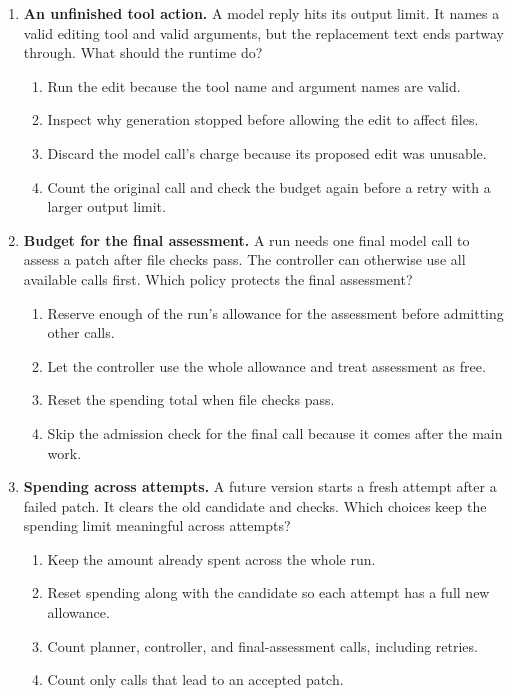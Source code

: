 \begin{enumerate}[start=51,itemsep=0.7\baselineskip]
\item\label{exercise:57} \begin{minipage}[t]{\linewidth}
\textbf{An unfinished tool action.} A model reply hits its output limit. It names a valid editing tool and valid arguments, but the replacement text ends partway through. What should the runtime do?
\begin{enumerate}[label=\textnormal{(\Alph*)},leftmargin=*,itemsep=0pt]
\item Run the edit because the tool name and argument names are valid.
\item Inspect why generation stopped before allowing the edit to affect files.
\item Discard the model call's charge because its proposed edit was unusable.
\item Count the original call and check the budget again before a retry with a larger output limit.
\end{enumerate}
\end{minipage}

\item\label{exercise:58} \begin{minipage}[t]{\linewidth}
\textbf{Budget for the final assessment.} A run needs one final model call to assess a patch after file checks pass. The controller can otherwise use all available calls first. Which policy protects the final assessment?
\begin{enumerate}[label=\textnormal{(\Alph*)},leftmargin=*,itemsep=0pt]
\item Reserve enough of the run's allowance for the assessment before admitting other calls.
\item Let the controller use the whole allowance and treat assessment as free.
\item Reset the spending total when file checks pass.
\item Skip the admission check for the final call because it comes after the main work.
\end{enumerate}
\end{minipage}

\item\label{exercise:59} \begin{minipage}[t]{\linewidth}
\textbf{Spending across attempts.} A future version starts a fresh attempt after a failed patch. It clears the old candidate and checks. Which choices keep the spending limit meaningful across attempts?
\begin{enumerate}[label=\textnormal{(\Alph*)},leftmargin=*,itemsep=0pt]
\item Keep the amount already spent across the whole run.
\item Reset spending along with the candidate so each attempt has a full new allowance.
\item Count planner, controller, and final-assessment calls, including retries.
\item Count only calls that lead to an accepted patch.
\end{enumerate}
\end{minipage}


\end{enumerate}
